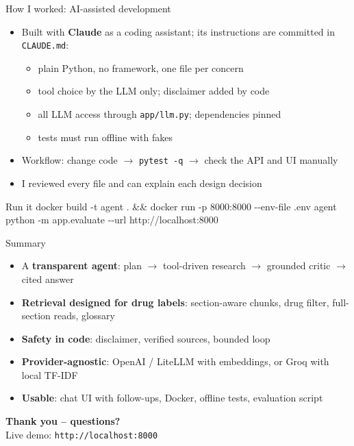 \documentclass[aspectratio=169,11pt]{beamer}
\newcommand{\file}[1]{\texttt{\small #1}}
\begin{document}
\begin{frame}{How I worked: AI-assisted development}
  \begin{itemize}
    \item Built with \textbf{Claude} as a coding assistant; its instructions are committed in \file{CLAUDE.md}:
      \begin{itemize}
        \item plain Python, no framework, one file per concern
        \item tool choice by the LLM only; disclaimer added by code
        \item all LLM access through \file{app/llm.py}; dependencies pinned
        \item tests must run offline with fakes
      \end{itemize}
    \item Workflow: change code $\rightarrow$ \texttt{pytest -q} $\rightarrow$ check the API and UI manually
    \item I reviewed every file and can explain each design decision
  \end{itemize}
  \vspace{0.6em}
  \begin{block}{Run it}
    \small\ttfamily
    docker build -t agent . \&\& docker run -p 8000:8000 -{}-env-file .env agent\\
    python -m app.evaluate -{}-url http://localhost:8000
  \end{block}
\end{frame}

\begin{frame}{Summary}
  \begin{itemize}
    \item A \textbf{transparent agent}: plan $\rightarrow$ tool-driven research $\rightarrow$ grounded critic $\rightarrow$ cited answer
    \item \textbf{Retrieval designed for drug labels}: section-aware chunks, drug filter, full-section reads, glossary
    \item \textbf{Safety in code}: disclaimer, verified sources, bounded loop
    \item \textbf{Provider-agnostic}: OpenAI / LiteLLM with embeddings, or Groq with local TF-IDF
    \item \textbf{Usable}: chat UI with follow-ups, Docker, offline tests, evaluation script
  \end{itemize}
  \vspace{1.2em}
  \centering
  {\Large\color{navy}\textbf{Thank you -- questions?}}\\[0.6em]
  {\small\color{grey} Live demo: \texttt{http://localhost:8000}}
\end{frame}
\end{document}
